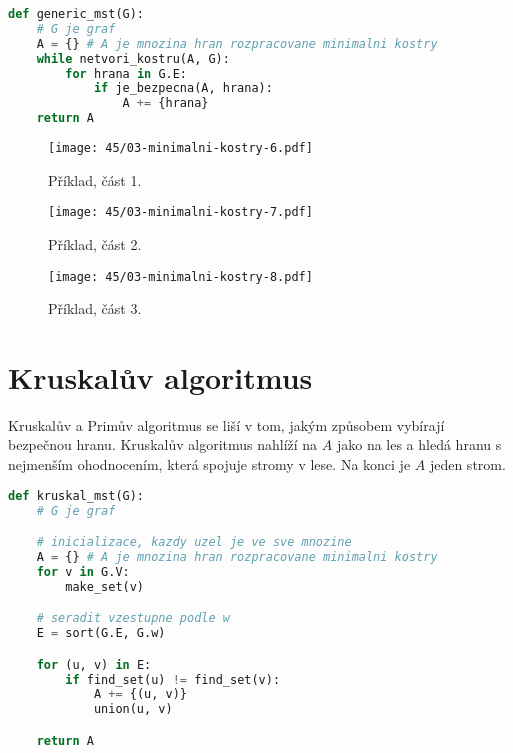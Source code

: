 \bigskip\noindent\begin{minipage}{\linewidth}
\begin{lstlisting}[language=Python, caption={Generický algoritmus. Před každou iterací algoritmu je množina $A$ podmnožinou nějaké minimální kostry. Hrana $(u,v) \in E$ je bezpečná pro $A$, pokud $A \cup \{(u, v)\}$ je podmnožinou nějaké minimální kostry.}]
def generic_mst(G):
    # G je graf
    A = {} # A je mnozina hran rozpracovane minimalni kostry
    while netvori_kostru(A, G):
        for hrana in G.E:
            if je_bezpecna(A, hrana):
                A += {hrana}
    return A
\end{lstlisting}
\end{minipage}

\begin{figure}[H]
    \centering
    \texttt{[image: 45/03-minimalni-kostry-6.pdf]}
    \caption{Příklad, část 1.}
\end{figure}

\begin{figure}[H]
    \centering
    \texttt{[image: 45/03-minimalni-kostry-7.pdf]}
    \caption{Příklad, část 2.}
\end{figure}

\begin{figure}[H]
    \centering
    \texttt{[image: 45/03-minimalni-kostry-8.pdf]}
    \caption{Příklad, část 3.}
\end{figure}


\section{Kruskalův algoritmus}

Kruskalův a Primův algoritmus se liší v tom, jakým způsobem vybírají bezpečnou hranu. Kruskalův algoritmus nahlíží na $A$ jako na les a hledá hranu s nejmenším ohodnocením, která spojuje stromy v lese. Na konci je $A$ jeden strom.

\bigskip\noindent\begin{minipage}{\linewidth}
\begin{lstlisting}[language=Python, caption={Kruskalův algoritmus. Funkce \texttt{make\_set(v)} vytvoří množinu obsahující $v$, \texttt{find\_set(v)} vrátí reprezentanta množiny ve které se nachází $v$, \texttt{union(u, v)} sjednotí dvě množiny obsahující $u$ a $v$.}]
def kruskal_mst(G):
    # G je graf

    # inicializace, kazdy uzel je ve sve mnozine
    A = {} # A je mnozina hran rozpracovane minimalni kostry
    for v in G.V:
        make_set(v)

    # seradit vzestupne podle w
    E = sort(G.E, G.w)

    for (u, v) in E:
        if find_set(u) != find_set(v):
            A += {(u, v)}
            union(u, v)

    return A
\end{lstlisting}
\end{minipage}

